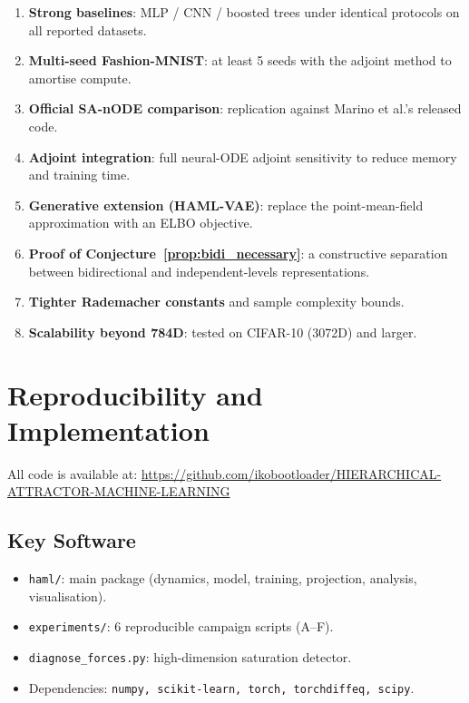 \documentclass[11pt,a4paper]{article}
\begin{document}
\begin{enumerate}
  \item \textbf{Strong baselines}: MLP / CNN / boosted trees under identical protocols on
        all reported datasets.
  \item \textbf{Multi-seed Fashion-MNIST}: at least 5 seeds with the adjoint method to
        amortise compute.
  \item \textbf{Official SA-nODE comparison}: replication against Marino et al.'s released
        code.
  \item \textbf{Adjoint integration}: full neural-ODE adjoint sensitivity to reduce
        memory and training time.
  \item \textbf{Generative extension (HAML-VAE)}: replace the point-mean-field
        approximation with an ELBO objective.
  \item \textbf{Proof of Conjecture~\ref{prop:bidi_necessary}}: a constructive separation
        between bidirectional and independent-levels representations.
  \item \textbf{Tighter Rademacher constants} and sample complexity bounds.
  \item \textbf{Scalability beyond 784D}: tested on CIFAR-10 (3072D) and larger.
\end{enumerate}

\section{Reproducibility and Implementation}

All code is available at:
\url{https://github.com/ikobootloader/HIERARCHICAL-ATTRACTOR-MACHINE-LEARNING}

\subsection{Key Software}

\begin{itemize}
  \item \texttt{haml/}: main package (dynamics, model, training, projection, analysis,
        visualisation).
  \item \texttt{experiments/}: 6 reproducible campaign scripts (A--F).
  \item \texttt{diagnose\_forces.py}: high-dimension saturation detector.
  \item Dependencies: \texttt{numpy, scikit-learn, torch, torchdiffeq, scipy}.
\end{itemize}
\end{document}
